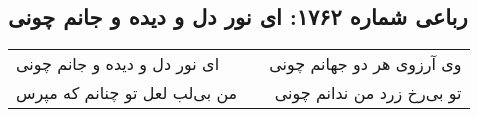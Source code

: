 \begin{center}
\section*{رباعی شماره ۱۷۶۲: ای نور دل و دیده و جانم چونی}
\label{sec:1762}
\begin{longtable}{l p{0.5cm} r}
ای نور دل و دیده و جانم چونی
&&
وی آرزوی هر دو جهانم چونی
\\
من بی‌لب لعل تو چنانم که مپرس
&&
تو بی‌رخ زرد من ندانم چونی
\\
\end{longtable}
\end{center}
